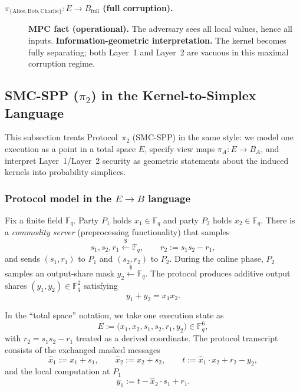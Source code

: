 \documentclass[11pt,a4paper]{article}
\theoremstyle{definition}
\theoremstyle{plain}
\newcommand{\F}{\mathbb{F}}
\begin{document}
\begin{description}
    \item[\textbf{$\pi_{\{\mathrm{Alice},\mathrm{Bob},\mathrm{Charlie}\}}:E\to B_{\mathrm{full}}$ (full corruption).}]
    \textbf{MPC fact (operational).} The adversary sees all local values, hence all inputs.
    \textbf{Information-geometric interpretation.} The kernel becomes fully separating; both Layer~1 and Layer~2 are vacuous in this maximal corruption regime.
\end{description}

\subsection{SMC-SPP (\texorpdfstring{$\pi_2$}{pi2}) in the Kernel-to-Simplex Language}
\label{subsec:protocol-smc-spp}
This subsection treats Protocol~$\pi_2$ (SMC-SPP) in the same style: we model one execution as a point in a total space $E$, specify view maps $\pi_A:E\to B_A$, and interpret Layer~1/Layer~2 security as geometric statements about the induced kernels into probability simplices.

\subsubsection{Protocol model in the $E\to B$ language}
Fix a finite field $\F_q$.
Party $P_1$ holds $x_1\in\F_q$ and party $P_2$ holds $x_2\in\F_q$.
There is a \emph{commodity server} (preprocessing functionality) that samples
\[
s_1,s_2,r_1 \xleftarrow{\$} \F_q,\qquad r_2 := s_1s_2-r_1,
\]
and sends $(s_1,r_1)$ to $P_1$ and $(s_2,r_2)$ to $P_2$.
During the online phase, $P_2$ samples an output-share mask $y_2\xleftarrow{\$}\F_q$.
The protocol produces additive output shares $(y_1,y_2)\in \F_q^2$ satisfying
\[
y_1+y_2 = x_1x_2.
\]

In the ``total space'' notation, we take one execution state as
\[
E:=\bigl(x_1,x_2,s_1,s_2,r_1,y_2\bigr)\in \F_q^{6},
\]
with $r_2=s_1s_2-r_1$ treated as a derived coordinate.
The protocol transcript consists of the exchanged masked messages
\[
\hat x_1 := x_1+s_1,\qquad \hat x_2:=x_2+s_2,\qquad
t := \hat x_1\cdot x_2 + r_2 - y_2,
\]
and the local computation at $P_1$
\[
y_1 := t - \hat x_2\cdot s_1 + r_1.
\]
\end{document}
